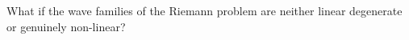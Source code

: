 \begin{sectionbox}\nospacing
   What if the wave families of the Riemann problem are neither linear degenerate or genuinely non-linear?

\end{sectionbox}
